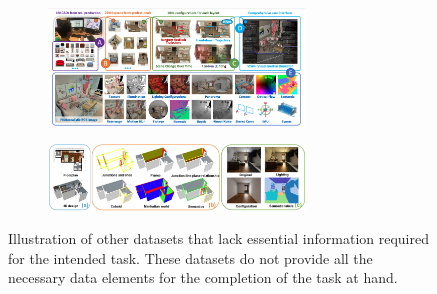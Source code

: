 \begin{figure}
    \centering
    \begin{subfigure}{\textwidth}
        \centering
         \includegraphics[width=0.75\textwidth]{figures/methods/interiornet.png}
         \caption{}
         \label{fig:rendering_dataset_interiornet}
    \end{subfigure}
    \hfill
    \begin{subfigure}{\textwidth}
        \centering
         \includegraphics[width=0.75\textwidth]{figures/methods/structured3d.png}
         \caption{}
         \label{fig:rendering_dataset_structured}
    \end{subfigure}
    \caption[State of the Art Dataset for 3D data]{
Illustration of other datasets that lack essential information required for the intended task. These datasets do not provide all the necessary data elements for the completion of the task at hand.}
    \label{fig:render_dataset_other_example}
\end{figure}

